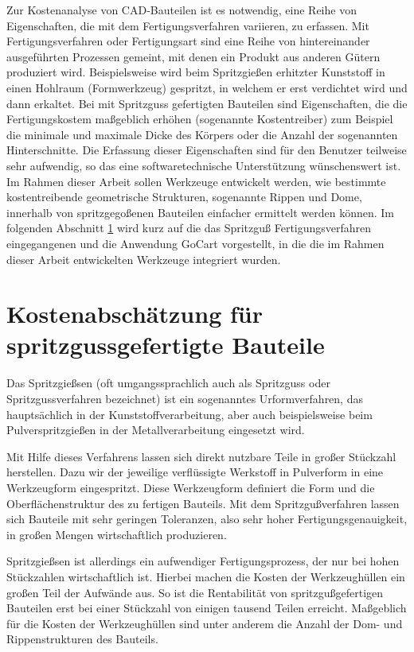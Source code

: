 Zur Kostenanalyse von CAD-Bauteilen ist es notwendig, eine Reihe von Eigenschaften, die mit dem Fertigungsverfahren variieren, zu erfassen. Mit Fertigungsverfahren oder Fertigungsart sind eine Reihe von hintereinander ausgef\"uhrten Prozessen gemeint, mit denen ein Produkt aus anderen G\"utern produziert wird. Beispielsweise wird beim Spritzgie{\ss}en erhitzter Kunststoff in einen Hohlraum (Formwerkzeug) gespritzt, in welchem er erst verdichtet wird und dann erkaltet. Bei mit Spritzguss gefertigten Bauteilen sind Eigenschaften, die die Fertigungskostem ma{\ss}geblich erh\"ohen (sogenannte Kostentreiber) zum Beispiel die minimale und maximale Dicke des K\"orpers oder die Anzahl der sogenannten Hinterschnitte. Die Erfassung dieser Eigenschaften sind f\"ur den Benutzer teilweise sehr aufwendig, so das eine softwaretechnische Unterst\"utzung w\"unschenswert ist. Im Rahmen dieser Arbeit sollen Werkzeuge entwickelt werden, wie bestimmte kostentreibende geometrische Strukturen, sogenannte Rippen und Dome, innerhalb von spritzgego{\ss}enen Bauteilen einfacher ermittelt werden k\"onnen. Im folgenden Abschnitt \ref{injection} wird kurz auf die das Spritzgu{\ss} Fertigungsverfahren eingegangenen und die Anwendung GoCart vorgestellt, in die die im Rahmen dieser Arbeit entwickelten Werkzeuge integriert wurden.
 
\section{Kostenabsch\"atzung f\"ur spritzgussgefertigte Bauteile}
\label{injection}

Das Spritzgie{\ss}sen (oft umgangssprachlich auch als Spritzguss oder Spritzgussverfahren bezeichnet) ist ein sogenanntes Urformverfahren, das haupts\"achlich in der Kunststoffverarbeitung, aber auch beispielsweise beim Pulverspritzgie{\ss}en in der Metallverarbeitung eingesetzt wird.

Mit Hilfe dieses Verfahrens lassen sich direkt nutzbare Teile in gro{\ss}er St\"uckzahl herstellen. Dazu wir der jeweilige verfl\"ussigte  Werkstoff in Pulverform in eine Werkzeugform eingespritzt. Diese Werkzeugform definiert die Form und die Oberfl\"achenstruktur des zu fertigen Bauteils. Mit dem Spritzgu{\ss}verfahren lassen sich Bauteile mit sehr geringen Toleranzen, also sehr hoher Fertigungsgenauigkeit, in gro{\ss}en Mengen wirtschaftlich produzieren. 

Spritzgie{\ss}sen ist allerdings ein aufwendiger Fertigungsprozess, der nur bei hohen St\"uckzahlen wirtschaftlich ist. Hierbei machen die Kosten der Werkzeugh\"ullen ein gro{\ss}en Teil der Aufw\"ande aus. So ist die Rentabilit\"at von spritzgu{\ss}gefertigen Bauteilen erst bei einer St\"uckzahl von einigen tausend Teilen erreicht. Ma{\ss}geblich f\"ur die Kosten der Werkzeugh\"ullen sind unter anderem die Anzahl der Dom- und Rippenstrukturen des Bauteils. 

